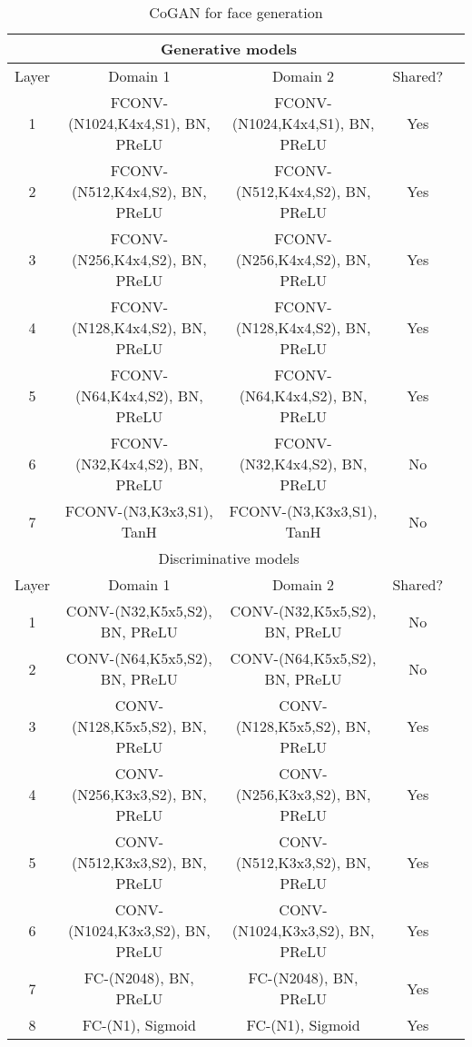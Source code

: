 \documentclass{article}
\begin{document}
\begin{table*}[thb!]
\small
\centering
{
\caption{CoGAN for face generation}
\label{tbl::face_g}
\begin{tabular}{|c|c|c|c|c|}
\hline
\multicolumn{4}{|c|}{Generative models}\\
\hline\rule{0pt}{2ex}    
Layer &  Domain 1 & Domain 2 & Shared? \\
\hline 
1 &  FCONV-(N1024,K4x4,S1), BN, PReLU & FCONV-(N1024,K4x4,S1), BN, PReLU & Yes\\
2 &  FCONV-(N512,K4x4,S2), BN, PReLU & FCONV-(N512,K4x4,S2), BN, PReLU & Yes\\
3 &  FCONV-(N256,K4x4,S2), BN, PReLU & FCONV-(N256,K4x4,S2), BN, PReLU & Yes\\
4 &  FCONV-(N128,K4x4,S2), BN, PReLU & FCONV-(N128,K4x4,S2), BN, PReLU & Yes\\
5 &  FCONV-(N64,K4x4,S2), BN, PReLU & FCONV-(N64,K4x4,S2), BN, PReLU & Yes\\
6 &  FCONV-(N32,K4x4,S2), BN, PReLU & FCONV-(N32,K4x4,S2), BN, PReLU & No\\
7 &  FCONV-(N3,K3x3,S1), TanH & FCONV-(N3,K3x3,S1), TanH & No\\
\hline
\hline
\multicolumn{4}{|c|}{Discriminative models}\\
\hline\rule{0pt}{2ex} 
Layer &  Domain 1 & Domain 2 & Shared? \\
\hline
1 & CONV-(N32,K5x5,S2), BN, PReLU & CONV-(N32,K5x5,S2), BN, PReLU &No\\
2 & CONV-(N64,K5x5,S2), BN, PReLU & CONV-(N64,K5x5,S2), BN, PReLU &No\\
3 & CONV-(N128,K5x5,S2), BN, PReLU & CONV-(N128,K5x5,S2), BN, PReLU &Yes\\
4 & CONV-(N256,K3x3,S2), BN, PReLU & CONV-(N256,K3x3,S2), BN, PReLU &Yes\\
5 & CONV-(N512,K3x3,S2), BN, PReLU & CONV-(N512,K3x3,S2), BN, PReLU &Yes\\
6 & CONV-(N1024,K3x3,S2), BN, PReLU & CONV-(N1024,K3x3,S2), BN, PReLU &Yes\\
7 & FC-(N2048), BN, PReLU & FC-(N2048), BN, PReLU &Yes\\
8 & FC-(N1), Sigmoid & FC-(N1), Sigmoid &Yes\\
\hline
\end{tabular}
}
\end{table*}
\end{document}
